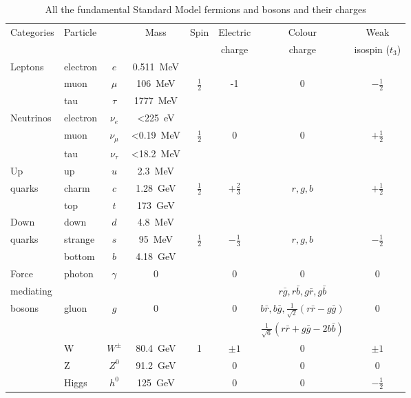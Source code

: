 \begin{table}[htbp!]
\begin{tabular}{l|l c|c|c|c|c|c}
Categories & Particle & & Mass & Spin & Electric & Colour & Weak \\
 &  & & & & charge & charge & isospin ($t_3$)\\
\hline
\hline
Leptons & electron & $e$ & 0.511~MeV & & & & \\
                & muon & $\mu$ & 106~MeV & $\frac{1}{2}$ & -1  & 0 &  $-\frac{1}{2}$\\
                & tau & $\tau$ & 1777~MeV  & &   &  &  \\
\hline
Neutrinos & electron & $\nu_e$ & <225~eV & & & & \\
                & muon & $\nu_{\mu}$ & <0.19~MeV & $\frac{1}{2}$  & 0  & 0 &  $+\frac{1}{2}$\\
                & tau & $\nu_{\tau}$ & <18.2~MeV &  &   &  &  \\
\hline
Up & up & $u$ & 2.3~MeV & & & \\
quarks      & charm & $c$ & 1.28~GeV & $\frac{1}{2}$ & $+\frac{2}{3}$  & $r,g,b$ &  $+\frac{1}{2}$\\
                & top & $t$ & 173~GeV  &   &  &  \\
\hline
Down  & down & $d$ & 4.8~MeV & & & & \\
quarks & strange & $s$ & 95~MeV & $\frac{1}{2}$ & $-\frac{1}{3}$  & $r,g,b$ &  $-\frac{1}{2}$\\
                & bottom & $b$ & 4.18~GeV &  &   &  &  \\
\hline
Force & photon & $\gamma$ & 0 &  & 0 & 0 & 0 \\
\cline{2-8}
 mediating &  &  &  &  &  & $r\bar{g},r\bar{b},g\bar{r},g\bar{b}$\\
 bosons & gluon & $g$ & 0 &  & 0 & $b\bar{r},b\bar{g},
\frac{1}{\sqrt{2}}(r\bar{r}-g\bar{g})$ & 0 \\
 & &  &  &  &  & $\frac{1}{\sqrt{6}}(r\bar{r}+g\bar{g}-2b\bar{b})$ &  \\
\cline{2-8}
 & W & $W^{\pm}$ & 80.4~GeV & 1 & $\pm 1$ & 0 & $\pm 1$ \\
 & Z & $Z^0$ & 91.2~GeV &  & 0 & 0 & 0 \\
 & Higgs & $h^0$ & 125~GeV &  & 0 & 0 & $-\frac{1}{2}$ \\
\end{tabular}
\caption{All the fundamental Standard Model fermions and bosons and
their charges \cite{PhysRevD.86.010001}}
\label{tab:smParticles}
\end{table}

